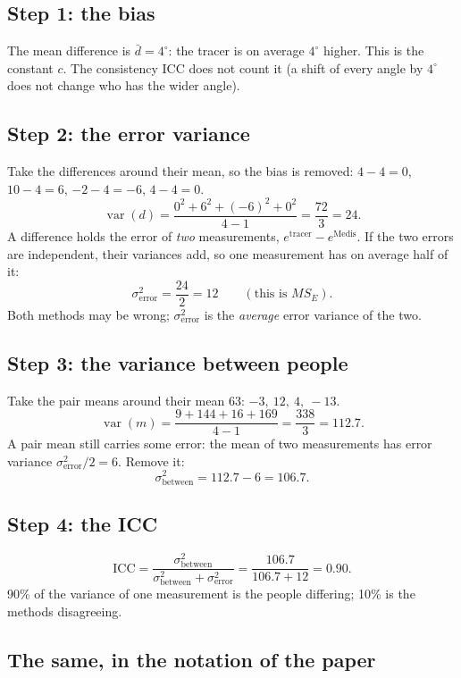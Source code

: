 \documentclass[11pt]{article}
\begin{document}
\subsection*{Step 1: the bias}

The mean difference is $\bar d = 4^\circ$: the tracer is on average $4^\circ$ higher. This is the constant $c$.
The consistency ICC does not count it (a shift of every angle by $4^\circ$ does not change who has the wider angle).

\subsection*{Step 2: the error variance}

Take the differences around their mean, so the bias is removed: $4-4=0$, $10-4=6$, $-2-4=-6$, $4-4=0$.
\[
  \operatorname{var}(d) = \frac{0^2 + 6^2 + (-6)^2 + 0^2}{4-1} = \frac{72}{3} = 24 .
\]
A difference holds the error of \emph{two} measurements, $e^{\text{tracer}} - e^{\text{Medis}}$. If the two
errors are independent, their variances add, so one measurement has on average half of it:
\[
  \sigma^2_{\text{error}} = \frac{24}{2} = 12 \qquad (\text{this is } MS_E).
\]
Both methods may be wrong; $\sigma^2_{\text{error}}$ is the \emph{average} error variance of the two.

\subsection*{Step 3: the variance between people}

Take the pair means around their mean 63: $-3,\ 12,\ 4,\ -13$.
\[
  \operatorname{var}(m) = \frac{9 + 144 + 16 + 169}{4-1} = \frac{338}{3} = 112.7 .
\]
A pair mean still carries some error: the mean of two measurements has error variance
$\sigma^2_{\text{error}}/2 = 6$. Remove it:
\[
  \sigma^2_{\text{between}} = 112.7 - 6 = 106.7 .
\]

\subsection*{Step 4: the ICC}

\[
  \text{ICC} = \frac{\sigma^2_{\text{between}}}{\sigma^2_{\text{between}} + \sigma^2_{\text{error}}}
             = \frac{106.7}{106.7 + 12} = 0.90 .
\]
90\% of the variance of one measurement is the people differing; 10\% is the methods disagreeing.

\subsection*{The same, in the notation of the paper}
\end{document}
